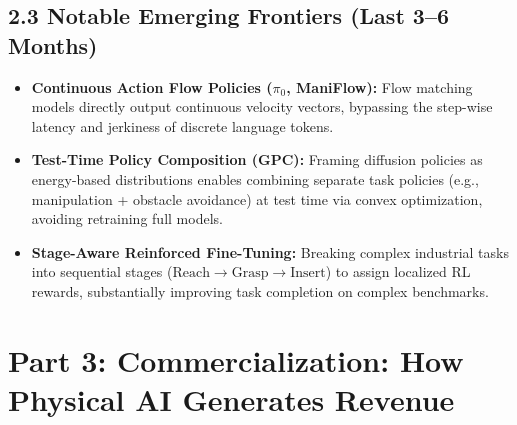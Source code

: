 \documentclass[11pt,a4paper]{article}
\begin{document}
\subsection{2.3 Notable Emerging Frontiers (Last 3--6 Months)}
\begin{itemize}
    \item \textbf{Continuous Action Flow Policies ($\pi_0$, ManiFlow):} Flow matching models directly output continuous velocity vectors, bypassing the step-wise latency and jerkiness of discrete language tokens.
    \item \textbf{Test-Time Policy Composition (GPC):} Framing diffusion policies as energy-based distributions enables combining separate task policies (e.g., manipulation + obstacle avoidance) at test time via convex optimization, avoiding retraining full models.
    \item \textbf{Stage-Aware Reinforced Fine-Tuning:} Breaking complex industrial tasks into sequential stages ($\text{Reach} \to \text{Grasp} \to \text{Insert}$) to assign localized RL rewards, substantially improving task completion on complex benchmarks.
\end{itemize}

\section{Part 3: Commercialization: How Physical AI Generates Revenue}
\end{document}
